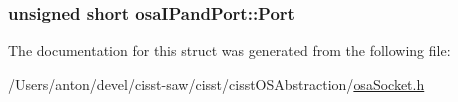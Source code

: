 \subsubsection[{Port}]{\setlength{\rightskip}{0pt plus 5cm}unsigned short osa\+I\+Pand\+Port\+::\+Port}\label{structosa_i_pand_port_af453d309ea5394037e662725ac6dee10}


The documentation for this struct was generated from the following file\+:\begin{DoxyCompactItemize}
\item 
/\+Users/anton/devel/cisst-\/saw/cisst/cisst\+O\+S\+Abstraction/\hyperlink{osa_socket_8h}{osa\+Socket.\+h}\end{DoxyCompactItemize}
